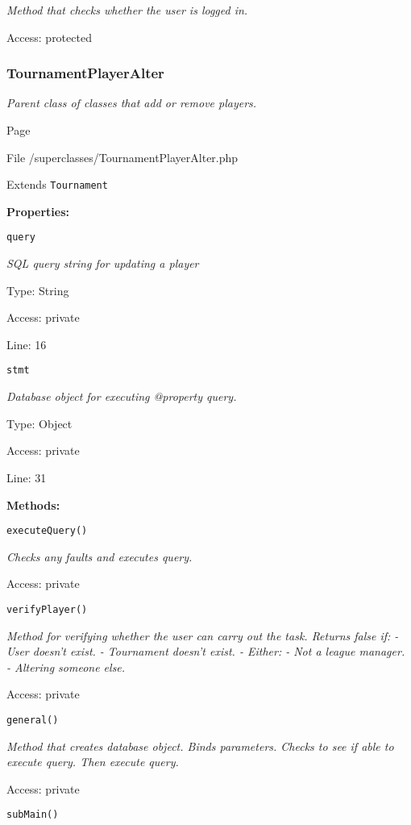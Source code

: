 {\scriptsize
\textit{Method that checks whether the user is logged in.}

Access: protected

}

\subsubsection{TournamentPlayerAlter}
\textit{Parent class of classes that add or remove players.}

Page \pageref{TournamentPlayerAlter.php}

File /superclasses/TournamentPlayerAlter.php

Extends \texttt{Tournament}

\textbf{Properties:}

\texttt{query}

{\scriptsize
\textit{SQL query string for updating a player}

Type: String

Access: private

Line: 16

}
\texttt{stmt}

{\scriptsize
\textit{Database object for executing @property query.}

Type: Object

Access: private

Line: 31

}
\textbf{Methods:}

\texttt{executeQuery()}

{\scriptsize
\textit{Checks any faults and executes query.}

Access: private

}

\texttt{verifyPlayer()}

{\scriptsize
\textit{Method for verifying whether the user can carry out the task.
Returns false if:
- User doesn't exist.
- Tournament doesn't exist.
- Either:
  - Not a league manager.
  - Altering someone else.}

Access: private

}

\texttt{general()}

{\scriptsize
\textit{Method that creates database object.
Binds parameters.
Checks to see if able to execute query.
Then execute query.}

Access: private

}

\texttt{subMain()}

